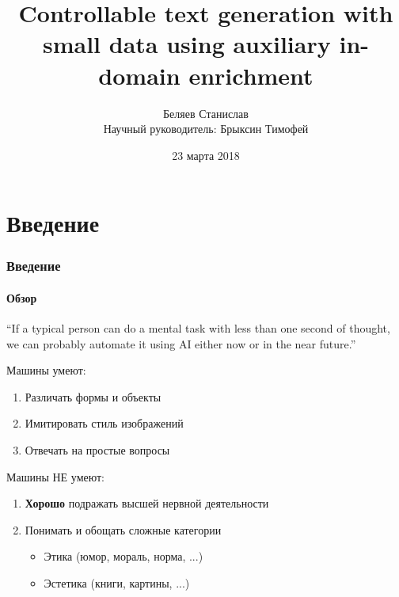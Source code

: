 \documentclass[10pt]{beamer}
\title[Controllable text generation]{Controllable text generation with small data using auxiliary in-domain enrichment}
\author[Беляев Станислав]{
Беляев Станислав\texorpdfstring{\\ Научный руководитель: Брыксин Тимофей}{}
}
\institute[СПбАУ]
{
Санкт-Петербургский Академический Университет \\
\medskip
\textit{stasbelyaev96@gmail.com}
}
\date{23 марта 2018}
\begin{document}
\begin{frame}
\titlepage
\end{frame}
\section{Введение}
\begin{frame}
\frametitle{Введение}
\framesubtitle{Обзор}

\begin{exampleblock}{}
  {\Large “If a typical person can do a mental task with less than one second of thought, we can probably automate it using AI either now or in the near future.”}
  \vskip2mm
  \hspace*{}
\end{exampleblock}

Машины умеют:
\begin{enumerate}
    \item Различать формы и объекты
    \item Имитировать стиль изображений
    \item Отвечать на простые вопросы
\end{enumerate}

Машины НЕ умеют:
\begin{enumerate}
    \item \textbf{Хорошо} подражать высшей нервной деятельности
    \item Понимать и обощать сложные категории
    \begin{itemize}
        \item Этика (юмор, мораль, норма, ...)
        \item Эстетика (книги, картины, ...)
    \end{itemize}
\end{enumerate}

\end{frame}
\end{document}
